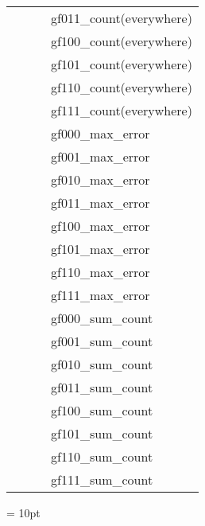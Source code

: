 \begin{tabular*}{160mm}{cll}
~& ~ &gf011\_count(everywhere)\\ 
~& ~ &gf100\_count(everywhere)\\ 
~& ~ &gf101\_count(everywhere)\\ 
~& ~ &gf110\_count(everywhere)\\ 
~& ~ &gf111\_count(everywhere)\\ 
~& ~ &gf000\_max\_error\\ 
~& ~ &gf001\_max\_error\\ 
~& ~ &gf010\_max\_error\\ 
~& ~ &gf011\_max\_error\\ 
~& ~ &gf100\_max\_error\\ 
~& ~ &gf101\_max\_error\\ 
~& ~ &gf110\_max\_error\\ 
~& ~ &gf111\_max\_error\\ 
~& ~ &gf000\_sum\_count\\ 
~& ~ &gf001\_sum\_count\\ 
~& ~ &gf010\_sum\_count\\ 
~& ~ &gf011\_sum\_count\\ 
~& ~ &gf100\_sum\_count\\ 
~& ~ &gf101\_sum\_count\\ 
~& ~ &gf110\_sum\_count\\ 
~& ~ &gf111\_sum\_count\\ 
\end{tabular*} 



\vspace{5mm}\parskip = 10pt 


